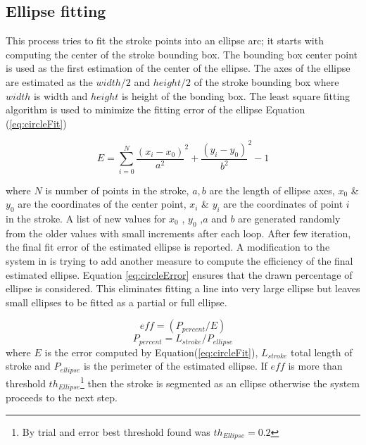 \documentclass[preprint,1p,times,review]{elsarticle}
\begin{document}
\subsection{Ellipse fitting}

This process tries to fit the stroke points into an ellipse arc; it starts with
computing the center of the stroke bounding box. The bounding box center point
is used as the first estimation of the center of the ellipse. The axes of the
ellipse are estimated as the $width/2$ and $height/2$ of the stroke bounding box
where $width$ is width and $height$ is height of the bonding box. The least
square fitting algorithm \cite{chernov} is used to minimize the fitting error of
the ellipse Equation (\ref{eq:circleFit})

\begin{equation}
E = \sum\limits_{i = 0}^N {\frac{{(x_i - x_0 )}}{{a^2 }}^2  + \frac{{(y_i - y_0
)}}{{b^2 }}^2  - 1}
\label{eq:circleFit}
\end{equation}

 where $N$ is number of points in the stroke, $a,b$ are the length of ellipse
axes, $x_0$ \& $y_0$ are the coordinates of the center point, $x_i$ \& $y_i$ are
the coordinates of point $i$ in the stroke. A list of new values for $x_0$ ,
$y_0$ ,$a$ and $b$ are generated randomly from the older values with small
increments after each loop.  After few iteration, the final fit error of the
estimated ellipse is reported. A modification to the system in \cite{mypaper} is
trying to add another measure to compute the efficiency of the final estimated
ellipse. Equation \ref{eq:circleError} ensures that the drawn percentage of
ellipse is considered. This eliminates fitting a line into very large ellipse
but leaves small ellipses to be fitted as a partial or full ellipse.

 \begin{equation}
eff= (P_{percent}/E)
\label{eq:circleError}
\end{equation}
 \begin{equation}
P_{percent}  = L_{stroke} /P_{ellipse}
\label{eq:ErrorArea}
\end{equation}
where $E$ is the error computed by Equation(\ref{eq:circleFit}), $L_{stroke}$
total length of stroke and $P_{ellipse} $ is the perimeter of the estimated
ellipse. If $eff$ is more than threshold $th_{Ellipse}$\footnote{By trial and
error best threshold found was $th_{Ellipse}=0.2$} then the stroke is segmented
as an ellipse otherwise the system proceeds to the next step.
\end{document}
